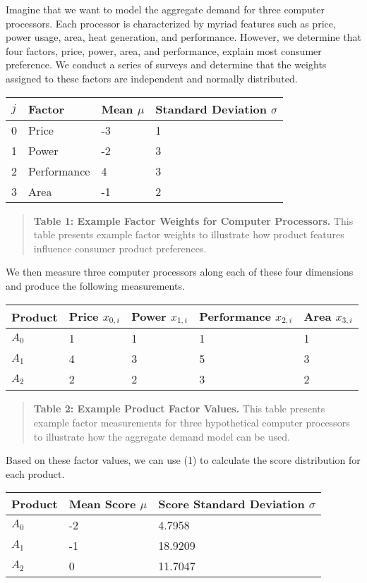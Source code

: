 \documentclass[]{article}
\begin{document}
Imagine that we want to model the aggregate demand for three computer
processors. Each processor is characterized by myriad features such as
price, power usage, area, heat generation, and performance. However, we
determine that four factors, price, power, area, and performance,
explain most consumer preference. We conduct a series of surveys and
determine that the weights assigned to these factors are independent and
normally distributed.

\begin{longtable}[]{@{}llll@{}}
\toprule
\(j\) & Factor & Mean \(\mu\) & Standard Deviation
\(\sigma\)\tabularnewline
\midrule
\endhead
0 & Price & -3 & 1\tabularnewline
1 & Power & -2 & 3\tabularnewline
2 & Performance & 4 & 3\tabularnewline
3 & Area & -1 & 2\tabularnewline
\bottomrule
\end{longtable}

\begin{quote}
\textbf{Table 1: Example Factor Weights for Computer Processors.} This
table presents example factor weights to illustrate how product features
influence consumer product preferences.
\end{quote}

We then measure three computer processors along each of these four
dimensions and produce the following measurements.

\begin{longtable}[]{@{}lllll@{}}
\toprule
Product & Price \(x_{0,i}\) & Power \(x_{1,i}\) & Performance
\(x_{2,i}\) & Area \(x_{3,i}\)\tabularnewline
\midrule
\endhead
\(A_0\) & 1 & 1 & 1 & 1\tabularnewline
\(A_1\) & 4 & 3 & 5 & 3\tabularnewline
\(A_2\) & 2 & 2 & 3 & 2\tabularnewline
\bottomrule
\end{longtable}

\begin{quote}
\textbf{Table 2: Example Product Factor Values.} This table presents
example factor measurements for three hypothetical computer processors
to illustrate how the aggregate demand model can be used.
\end{quote}

Based on these factor values, we can use (1) to calculate the score
distribution for each product.

\begin{longtable}[]{@{}lll@{}}
\toprule
Product & Mean Score \(\mu\) & Score Standard Deviation
\(\sigma\)\tabularnewline
\midrule
\endhead
\(A_0\) & -2 & 4.7958\tabularnewline
\(A_1\) & -1 & 18.9209\tabularnewline
\(A_2\) & 0 & 11.7047\tabularnewline
\bottomrule
\end{longtable}
\end{document}

